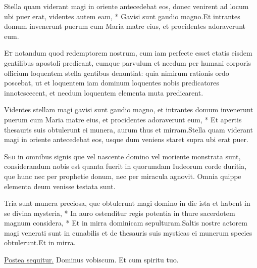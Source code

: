 \begin{multicols*}{2}
\begin{responsory}
{Stella quam viderant magi in oriente antecedebat eos, donec venirent ad locum ubi puer erat, videntes autem eam, * Gavisi sunt gaudio magno.}{Et intrantes domum invenerunt puerum cum Maria matre eius, et procidentes adoraverunt eum.}
\end{responsory}
\lettrine[lines=2]{\zallmancaps \color{Blue} E}{t} notandum quod redemptorem nostrum, cum iam perfecte esset etatis eisdem gentilibus apostoli predicant, eumque parvulum et necdum per humani corporis officium loquentem stella gentibus denuntiat: quia nimirum rationis ordo poscebat, ut et loquentem iam dominum loquentes nobis predicatores innotescecent, et necdum loquentem elementa muta predicarent.
\begin{responsory}
{Videntes stellam magi gavisi sunt gaudio magno, et intrantes domum invenerunt puerum cum Maria matre eius, et procidentes adoraverunt eum, * Et apertis thesauris suis obtulerunt ei munera, aurum thus et mirram.}{Stella quam viderant magi in oriente antecedebat eos, usque dum veniens staret supra ubi erat puer.}
\end{responsory}
\lettrine[lines=2]{\zallmancaps \color{Red} S}{ed} in omnibus signis que vel nascente domino vel moriente monstrata sunt, considerandum nobis est quanta fuerit in quorumdam Iudeorum corde duritia, que hunc nec per prophetie donum, nec per miracula agnovit. Omnia quippe elementa deum venisse testata sunt.
\begin{responsory-final}
{Tria sunt munera preciosa, que obtulerunt magi domino in die ista et habent in se divina mysteria, * In auro ostenditur regis potentia in thure sacerdotem magnum considera, * Et in mirra dominicam sepulturam.}{Saltis nostre actorem magi venerati sunt in cunabilis et de thesauris suis mysticas ei munerum species obtulerunt.}{Et in mirra.}
\end{responsory-final}
\newline \ul{Postea sequitur.} Dominus vobiscum. Et cum spiritu tuo.

\end{multicols*}
